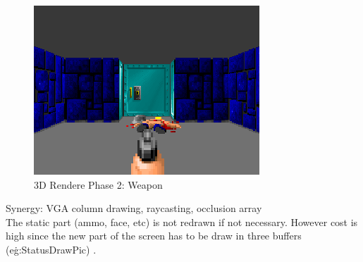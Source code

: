  \begin{figure}[H]
\centering
 \includegraphics[width=\textwidth]{screenshots/wolf3d_7_fullframe.png}
 \caption{3D Rendere Phase 2: Weapon} 
 \end{figure}
 

   Synergy: VGA column drawing, raycasting, occlusion array\\


The static part (ammo, face, etc) is not redrawn if not necessary. However cost is high since the new part of the screen has to be draw in three buffers (e\.g:StatusDrawPic) .










